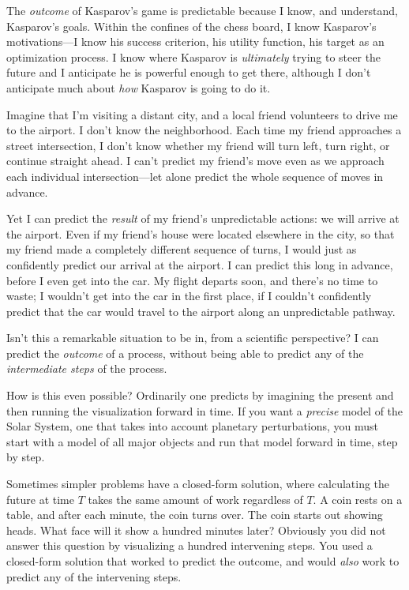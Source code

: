  The \textit{outcome} of Kasparov's game is
predictable because I know, and understand, Kasparov's
goals. Within the confines of the chess board, I know
Kasparov's motivations---I know his success criterion,
his utility function, his target as an optimization process. I know
where Kasparov is \textit{ultimately} trying to steer the future and I
anticipate he is powerful enough to get there, although I
don't anticipate much about \textit{how} Kasparov is
going to do it.


 Imagine that I'm visiting a distant city, and a
local friend volunteers to drive me to the airport. I
don't know the neighborhood. Each time my friend
approaches a street intersection, I don't know whether
my friend will turn left, turn right, or continue straight ahead. I
can't predict my friend's move even as
we approach each individual intersection---let alone predict the whole
sequence of moves in advance.


 Yet I can predict the \textit{result} of my
friend's unpredictable actions: we will arrive at the
airport. Even if my friend's house were located
elsewhere in the city, so that my friend made a completely different
sequence of turns, I would just as confidently predict our arrival at
the airport. I can predict this long in advance, before I even get into
the car. My flight departs soon, and there's no time to
waste; I wouldn't get into the car in the first place,
if I couldn't confidently predict that the car would
travel to the airport along an unpredictable pathway.

{
 Isn't this a remarkable situation to be in, from a
scientific perspective? I can predict the \textit{outcome} of a
process, without being able to predict any of the \textit{intermediate
steps} of the process.}


 How is this even possible? Ordinarily one predicts by imagining
the present and then running the visualization forward in time. If you
want a \textit{precise} model of the Solar System, one that takes into
account planetary perturbations, you must start with a model of all
major objects and run that model forward in time, step by step.


 Sometimes simpler problems have a closed-form solution, where
calculating the future at time $T$ takes the same amount of work
regardless of $T$\@. A coin rests on a table, and after each minute, the
coin turns over. The coin starts out showing heads. What face will it
show a hundred minutes later? Obviously you did not answer this
question by visualizing a hundred intervening steps. You used a
closed-form solution that worked to predict the outcome, and would
\textit{also} work to predict any of the intervening steps.


